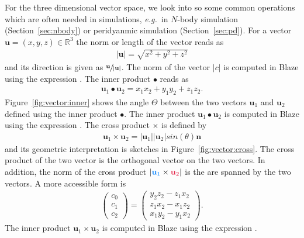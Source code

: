For the three dimensional vector space, we look into so some common operations which are often needed in simulations, \emph{e.g.}\ in $N$-body simulation (Section~\ref{sec:nbody}) or peridyanmic simulation (Section~\ref{sec:pd}). For a vector $\mathbf{u}=(x,y,z)\in\mathbb{R}^3$ the norm or length of the vector reads as
\begin{align}
\vert\mathbf{u}\vert = \sqrt{x^2+y^2+z^2}
\end{align}
and its direction is given as $\sfrac{\mathbf{u}}{\vert\mathbf{u}\vert}$. The norm of the vector $\vert c \vert$ is computed in Blaze using the expression . The inner product $\bullet$ reads as
\begin{align}
\mathbf{u}_1 \bullet \mathbf{u}_2 = x_1x_2 + y_1y_2 + z_1z_2\text{.}
\end{align}
Figure~\ref{fig:vector:inner} shows the angle $\Theta$ between the two vectors $\mathbf{u}_1$ and $\mathbf{u}_2$ defined using the inner product $\bullet$.  The inner product $\mathbf{u}_1 \bullet \mathbf{u}_2 $ is computed in Blaze using the expression . The cross product $\times$ is defined by
\begin{align}
\mathbf{u}_1 \times \mathbf{u}_2 = \vert\mathbf{u}_1 \vert \vert\mathbf{u}_2 \vert sin(\theta) \mathbf{n}
\end{align}
and its geometric interpretation is sketches in Figure~\ref{fig:vector:cross}. The cross product of the two vector is the orthogonal vector on the two vectors. In addition, the norm of the cross product $\vert\textcolor{azure}{\mathbf{u}_1}\times\textcolor{amaranth}{\mathbf{u}_2}\vert$ is the are spanned by the two vectors. A more accessible form is
\begin{align}
\left( \begin{matrix}
c_0 \\ c_1 \\ c_2
\end{matrix}\right) = \left( \begin{matrix}
y_2 z_2 - z_1 x_2 \\
z_1 x_2 - x_1 z_2 \\
x_1 y_2 - y_1x_2
\end{matrix}\right) \text{.}
\end{align}
The inner product $\mathbf{u}_1 \times \mathbf{u}_2 $ is computed in Blaze using the expression .

